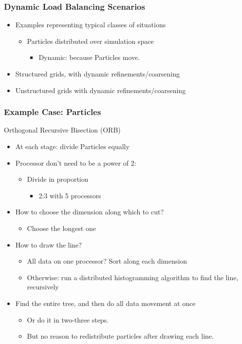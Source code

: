 \begin{frame}[fragile]
\frametitle{Dynamic Load Balancing Scenarios}
\begin{itemize}
 \item Examples representing typical classes of situations
 \begin{itemize}
  \item Particles distributed over simulation space
  \begin{itemize}
   \item Dynamic: because Particles move.
  \end{itemize}
 \end{itemize}
\item Structured grids, with dynamic refinements/coarsening
\item Unstructured grids with dynamic refinements/coarsening
\end{itemize}
\end{frame}

\begin{frame}[fragile]
\frametitle{Example Case: Particles}
 Orthogonal Recursive Bisection (ORB)
 \begin{itemize} 
  \item At each stage: divide Particles equally
  \item Processor don’t need to be a power of 2:
  \begin{itemize} 
   \item Divide in proportion 
   \begin{itemize} 
    \item 2:3 with 5 processors
   \end{itemize}
  \end{itemize}
 \item How to choose the dimension along which to cut?
 \begin{itemize} 
  \item Choose the longest one
 \end{itemize}
 \item How to draw the line?
 \begin{itemize} 
  \item All data on one processor? Sort along each dimension
  \item Otherwise: run a distributed histogramming algorithm to find the line, recursively
 \end{itemize}
 \item Find the entire tree, and then do all data movement at once
 \begin{itemize} 
  \item Or do it in two-three steps.
  \item But no reason to redistribute particles after drawing each line.
 \end{itemize}
\end{itemize}
\end{frame}

